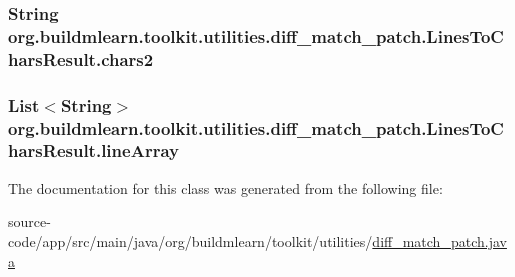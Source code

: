 \subsubsection[{\texorpdfstring{chars2}{chars2}}]{\setlength{\rightskip}{0pt plus 5cm}String org.\+buildmlearn.\+toolkit.\+utilities.\+diff\+\_\+match\+\_\+patch.\+Lines\+To\+Chars\+Result.\+chars2\hspace{0.3cm}{\ttfamily [protected]}}\hypertarget{classorg_1_1buildmlearn_1_1toolkit_1_1utilities_1_1diff__match__patch_1_1LinesToCharsResult_ac31f129e1fd73832de11bcc65a49c322}{}\label{classorg_1_1buildmlearn_1_1toolkit_1_1utilities_1_1diff__match__patch_1_1LinesToCharsResult_ac31f129e1fd73832de11bcc65a49c322}
\subsubsection[{\texorpdfstring{line\+Array}{lineArray}}]{\setlength{\rightskip}{0pt plus 5cm}List$<$String$>$ org.\+buildmlearn.\+toolkit.\+utilities.\+diff\+\_\+match\+\_\+patch.\+Lines\+To\+Chars\+Result.\+line\+Array\hspace{0.3cm}{\ttfamily [protected]}}\hypertarget{classorg_1_1buildmlearn_1_1toolkit_1_1utilities_1_1diff__match__patch_1_1LinesToCharsResult_aa2d7f5289bb2dfc874779ac2f48c0e82}{}\label{classorg_1_1buildmlearn_1_1toolkit_1_1utilities_1_1diff__match__patch_1_1LinesToCharsResult_aa2d7f5289bb2dfc874779ac2f48c0e82}


The documentation for this class was generated from the following file\+:\begin{DoxyCompactItemize}
\item 
source-\/code/app/src/main/java/org/buildmlearn/toolkit/utilities/\hyperlink{diff__match__patch_8java}{diff\+\_\+match\+\_\+patch.\+java}\end{DoxyCompactItemize}

